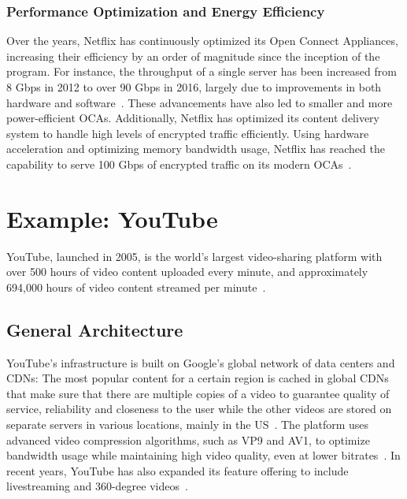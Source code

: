 \subsubsection{Performance Optimization and Energy Efficiency}

Over the years, Netflix has continuously optimized its Open Connect Appliances, increasing their efficiency by an order of magnitude since the inception of the program. For instance, the throughput of a single server has been increased from 8 Gbps in 2012 to over 90 Gbps in 2016, largely due to improvements in both hardware and software~\parencite{netflix_open_connect}. These advancements have also led to smaller and more power-efficient \ac{OCAs}.
Additionally, Netflix has optimized its content delivery system to handle high levels of encrypted traffic efficiently. Using hardware acceleration and optimizing memory bandwidth usage, Netflix has reached the capability to serve 100 Gbps of encrypted traffic on its modern \ac{OCAs}~\parencite{netflix_content_serving}.

\section{Example: YouTube}

YouTube, launched in 2005, is the world's largest video-sharing platform with over 500 hours of video content uploaded every minute, and approximately 694,000 hours of video content streamed per minute~\parencite{youtube_stats}.

\subsection{General Architecture}

YouTube's infrastructure is built on Google's global network of data centers and \ac{CDN}s: The most popular content for a certain region is cached in global \ac{CDN}s that make sure that there are multiple copies of a video to guarantee quality of service, reliability and closeness to the user while the other videos are stored on separate servers in various locations, mainly in the US~\parencite{youtube_architecture_2}. The platform uses advanced video compression algorithms, such as VP9 and AV1, to optimize bandwidth usage while maintaining high video quality, even at lower bitrates~\parencite{youtube_vpu}. 
In recent years, YouTube has also expanded its feature offering to include livestreaming and 360-degree videos~\parencite{youtube_live}.

